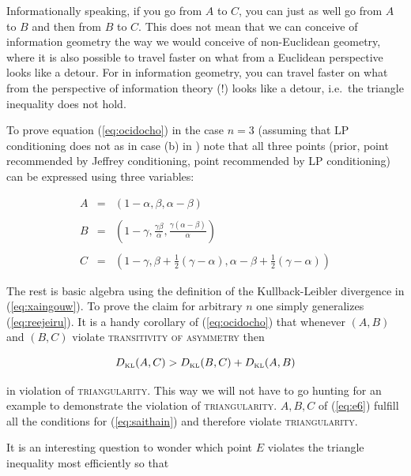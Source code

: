 \documentclass[phd,12pt,oneside]{ubcthesis}
\begin{document}
Informationally speaking, if you go from $A$ to $C$, you can just as
well go from $A$ to $B$ and then from $B$ to $C$. This does not mean
that we can conceive of information geometry the way we would conceive
of non-Euclidean geometry, where it is also possible to travel faster
on what from a Euclidean perspective looks like a detour. For in
information geometry, you can travel faster on what from the
perspective of information theory (!) looks like a detour, i.e.\ the
triangle inequality does not hold. 

To prove equation (\ref{eq:ocidocho}) in the case $n=3$ (assuming that
LP conditioning does not  as in case (b) in
) note that all three points
(prior, point recommended by Jeffrey conditioning, point recommended
by LP conditioning) can be expressed using three variables:

\begin{equation}
  \label{eq:reejeiru}
  \begin{array}{rcl}
    A&=&\left(1-\alpha,\beta,\alpha-\beta\right) \\
     && \\
    B&=&\left(1-\gamma,\frac{\gamma\beta}{\alpha},\frac{\gamma(\alpha-\beta)}{\alpha}\right) \\
     && \\
    C&=&\left(1-\gamma,\beta+\frac{1}{2}(\gamma-\alpha),\alpha-\beta+\frac{1}{2}(\gamma-\alpha)\right)
  \end{array}
\end{equation}

The rest is basic algebra using the definition of the Kullback-Leibler
divergence in (\ref{eq:xaingouw}). To prove the claim for arbitrary
$n$ one simply generalizes (\ref{eq:reejeiru}). It is a handy
corollary of (\ref{eq:ocidocho}) that whenever $(A,B)$ and $(B,C)$
violate \textsc{transitivity of asymmetry} then

\begin{equation}
  \label{eq:saithain}
  D_{\mbox{\tiny KL}}(A,C)>D_{\mbox{\tiny KL}}(B,C)+D_{\mbox{\tiny KL}}(A,B)
\end{equation}

{\noindent}in violation of \textsc{triangularity}. This way we will not have to
go hunting for an example to demonstrate the violation of
\textsc{triangularity}. $A,B,C$ of (\ref{eq:e6}) fulfill all the
conditions for (\ref{eq:saithain}) and therefore violate
\textsc{triangularity}.

It is an interesting question to wonder which point $E$ violates the
triangle inequality most efficiently so that
\end{document}

